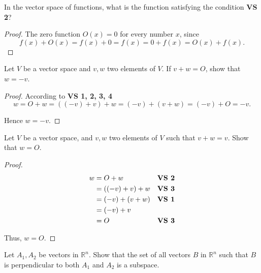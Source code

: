 \begin{exercise}
    In the vector space of functions, what is the function satisfying the condition \textbf{VS 2}?
\end{exercise}

\begin{proof}
    The zero function $O(x) = 0$ for every number $x$, since
    \[
        f(x) + O(x) = f(x) + 0 = f(x) = 0 + f(x) = O(x) + f(x).
    \]
\end{proof}

\begin{exercise}
    Let $V$ be a vector space and $v, w$ two elements of $V$. If $v + w = O$, show that $w = -v$.
\end{exercise}

\begin{proof}
    According to \textbf{VS 1, 2, 3, 4}
    \[
        w = O + w = ((-v) + v) + w = (-v) + (v + w) = (-v) + O = -v.
    \]

    Hence $w = -v$.
\end{proof}

\begin{exercise}
    Let $V$ be a vector space, and $v, w$ two elements of $V$ such that $v + w = v$. Show that $w = O$.
\end{exercise}

\begin{proof}
    \begin{align*}
        w & = O + w          & \text{\textbf{VS 2}} \\
          & = ((-v) + v) + w & \text{\textbf{VS 3}} \\
          & = (-v) + (v + w) & \text{\textbf{VS 1}} \\
          & = (-v) + v                              \\
          & = O              & \text{\textbf{VS 3}}
    \end{align*}

    Thus, $w = O$.
\end{proof}

\begin{exercise}
    Let $A_{1}, A_{2}$ be vectors in $\mathbb{R}^{n}$. Show that the set of all vectors $B$ in $\mathbb{R}^{n}$ such that $B$ is perpendicular to both $A_{1}$ and $A_{2}$ is a subspace.
\end{exercise}

